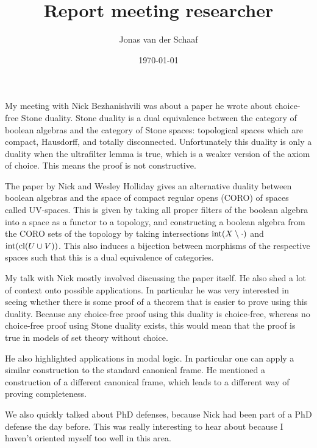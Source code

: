 \documentclass{article}
\title{Report meeting researcher}
\author{Jonas van der Schaaf}
\date{\today}
\begin{document}
\maketitle

My meeting with Nick Bezhanishvili was about a paper he wrote about choice-free
Stone duality. Stone duality is a dual equivalence between the category of
boolean algebras and the category of Stone spaces: topological spaces which are
compact, Hausdorff, and totally disconnected. Unfortunately this duality
is only a duality when the ultrafilter lemma is true, which is a weaker version
of the axiom of choice. This means the proof is not constructive.

The paper by Nick and Wesley Holliday gives an alternative duality between
boolean algebras and the space of compact regular opens (CORO) of spaces called
UV-spaces. This is given by taking all proper filters of the boolean algebra
into a space as a functor to a topology, and constructing a boolean algebra from
the CORO sets of the topology by taking intersections
\(\textnormal{int}(X\setminus\cdot)\) and
\(\textnormal{int}(\textnormal{cl}(U\cup V))\). This also induces a bijection
between morphisms of the respective spaces such that this is a dual equivalence
of categories.

My talk with Nick mostly involved discussing the paper itself. He also shed a
lot of context onto possible applications. In particular he was very interested
in seeing whether there is some proof of a theorem that is easier to prove using
this duality. Because any choice-free proof using this duality is choice-free,
whereas no choice-free proof using Stone duality exists, this would mean that
the proof is true in models of set theory without choice.

He also highlighted applications in modal logic. In particular one can apply a
similar construction to the standard canonical frame. He mentioned a
construction of a different canonical frame, which leads to a different way of
proving completeness.

We also quickly talked about PhD defenses, because Nick had been part of a PhD
defense the day before. This was really interesting to hear about because I
haven't oriented myself too well in this area.
\end{document}
